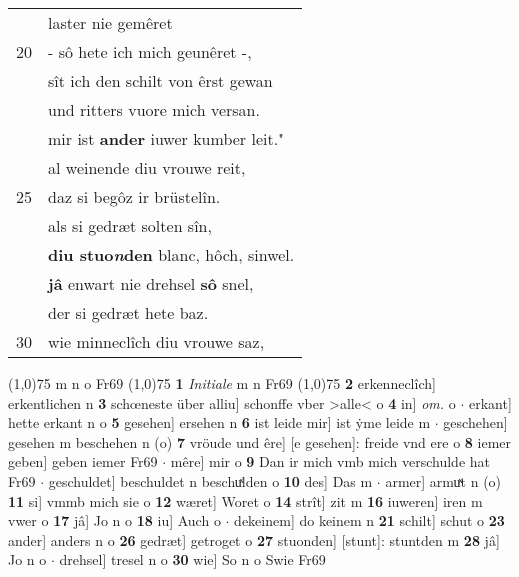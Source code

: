 \documentclass[8pt,a4paper,notitlepage]{article}
\begin{document}
\begin{table}[ht]
\begin{minipage}[t]{0.5\linewidth}
\begin{tabular}{rl}
 & laster nie gemêret\\ 
20 & - sô hete ich mich geunêret -,\\ 
 & sît ich den schilt von êrst gewan\\ 
 & und ritters vuore mich versan.\\ 
 & mir ist \textbf{ander} iuwer kumber leit."\\ 
 & al weinende diu vrouwe reit,\\ 
25 & daz si begôz ir brüstelîn.\\ 
 & als si gedræt solten sîn,\\ 
 & \textbf{diu stuo\textit{n}den} blanc, hôch, sinwel.\\ 
 & \textbf{jâ} enwart nie drehsel \textbf{sô} snel,\\ 
 & der si gedræt hete baz.\\ 
30 & wie minneclîch diu vrouwe saz,\\ 
\end{tabular}
\scriptsize
\line(1,0){75} \newline
m n o Fr69 \newline
\line(1,0){75} \newline
\textbf{1} \textit{Initiale} m n Fr69  \newline
\line(1,0){75} \newline
\textbf{2} erkenneclîch] erkentlichen n \textbf{3} schœneste über alliu] schonffe vber >alle< o \textbf{4} in] \textit{om.} o  $\cdot$ erkant] hette erkant n o \textbf{5} gesehen] ersehen n \textbf{6} ist leide mir] ist ẏme leide m  $\cdot$ geschehen] gesehen m beschehen n (o) \textbf{7} vröude und êre] [e gesehen]: freide vnd ere o \textbf{8} iemer geben] geben iemer Fr69  $\cdot$ mêre] mir o \textbf{9} Dan ir mich vmb mich verschulde hat Fr69  $\cdot$ geschuldet] beschuldet n beschuͯlden o \textbf{10} des] Das m  $\cdot$ armer] armuͯt n (o) \textbf{11} si] vmmb mich sie o \textbf{12} wæret] Woret o \textbf{14} strît] zit m \textbf{16} iuweren] iren m vwer o \textbf{17} jâ] Jo n o \textbf{18} iu] Auch o  $\cdot$ dekeinem] do keinem n \textbf{21} schilt] schut o \textbf{23} ander] anders n o \textbf{26} gedræt] getroget o \textbf{27} stuonden] [stunt]: stuntden m \textbf{28} jâ] Jo n o  $\cdot$ drehsel] tresel n o \textbf{30} wie] So n o Swie Fr69 \newline
\end{minipage}
\end{table}
\newpage
\end{document}
